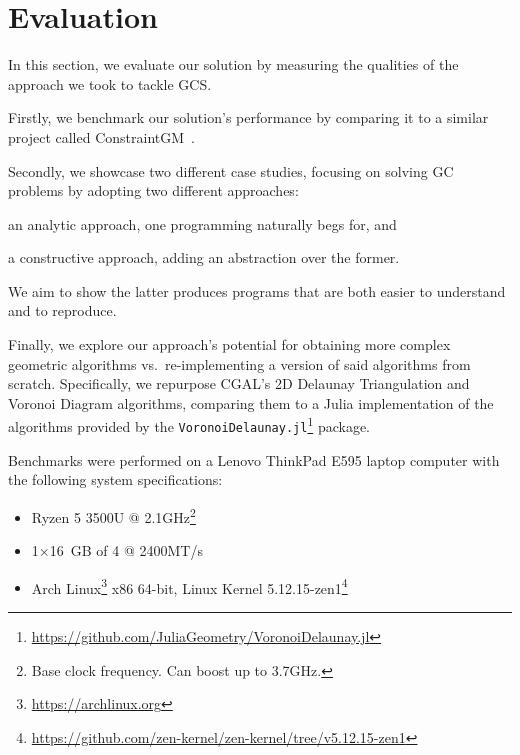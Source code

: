 \section{Evaluation}%
\label{sec:eval}

In this section, we evaluate our solution by measuring the qualities of the
approach we took to tackle \ac{GCS}.

Firstly, we benchmark our solution's performance by comparing it to a
similar project called ConstraintGM~\cite{Pinheiro:2016:MGR}.

Secondly, we showcase two different case studies, focusing on solving \ac{GC}
problems by adopting two different approaches: 
\begin{enumerate*}[label= (\arabic*)]
  \item an analytic approach, one programming naturally begs for, and 
  \item a constructive approach, adding an abstraction over the former.
\end{enumerate*}
We aim to show the latter produces programs that are both easier to understand
and to reproduce.

Finally, we explore our approach's potential for obtaining more complex
geometric algorithms vs.\ re-implementing a version of said algorithms from
scratch.  Specifically, we repurpose \ac{CGAL}'s 2D Delaunay Triangulation and
Voronoi Diagram algorithms, comparing them to a Julia implementation of the
algorithms provided by the
\texttt{VoronoiDelaunay.jl}\footnote{\url{https://github.com/JuliaGeometry/VoronoiDelaunay.jl}}
package.

Benchmarks were performed on a Lenovo{\textregistered}
ThinkPad{\textregistered} E595 laptop computer with the following
system specifications:

\begin{itemize}
  \item {}\label{acro:AMD} Ryzen\textsuperscript{\texttrademark} 5 3500U
  \label{acro:CPU} @ 2.1GHz\footnote{Base clock frequency.  Can boost
  up to 3.7GHz.}
  \item 1×16 GB \label{acro:SO-DIMM} of
  \label{acro:DDR}4 \label{acro:RAM} @ 2400MT/s
  \item Arch
  Linux\textsuperscript{\texttrademark}\footnote{\url{https://archlinux.org}}
  x86 64-bit, Linux{\textregistered} Kernel
  5.12.15-zen1\footnote{\url{https://github.com/zen-kernel/zen-kernel/tree/v5.12.15-zen1}}
\end{itemize}




